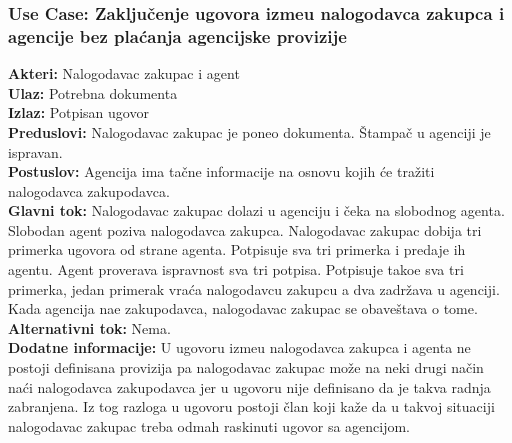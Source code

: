 \documentclass{article}
\begin{document}
\subsubsection{\bfseries Use Case: Zaklju\v {c}enje ugovora izme\dj u nalogodavca zakupca i agencije bez pla\' canja agencijske provizije }
{\bfseries Akteri:} Nalogodavac zakupac i agent\\
{\bfseries Ulaz:} Potrebna dokumenta\\
{\bfseries Izlaz:} Potpisan ugovor\\
{\bfseries Preduslovi:} Nalogodavac zakupac je poneo dokumenta. \v {S}tampa\v {c} u agenciji je ispravan. \\
{\bfseries Postuslov:} Agencija ima ta\v {c}ne informacije na osnovu kojih \' ce tra\v {z}iti nalogodavca zakupodavca. \\
{\bfseries Glavni tok:} Nalogodavac zakupac dolazi u agenciju i \v {c}eka na slobodnog agenta. Slobodan agent poziva nalogodavca zakupca. Nalogodavac zakupac dobija tri primerka ugovora od strane agenta. Potpisuje sva tri primerka i predaje ih agentu. Agent proverava ispravnost sva tri potpisa. Potpisuje tako\dj e sva tri primerka, jedan primerak vra\' ca nalogodavcu zakupcu a dva zadr\v {z}ava u agenciji. Kada agencija na\dj e zakupodavca, nalogodavac zakupac se obave\v {s}tava o tome. \\
{\bfseries Alternativni tok:} Nema. \\
{\bfseries Dodatne informacije:} U ugovoru izme\dj u nalogodavca zakupca i agenta ne postoji definisana provizija pa nalogodavac zakupac mo\v {z}e na neki drugi na\v {c}in na\' ci nalogodavca zakupodavca jer u ugovoru nije definisano da je takva radnja zabranjena. Iz tog razloga u ugovoru postoji \v {c}lan koji ka\v {z}e da u takvoj situaciji nalogodavac zakupac treba odmah raskinuti ugovor sa agencijom. \\
\end{document}
